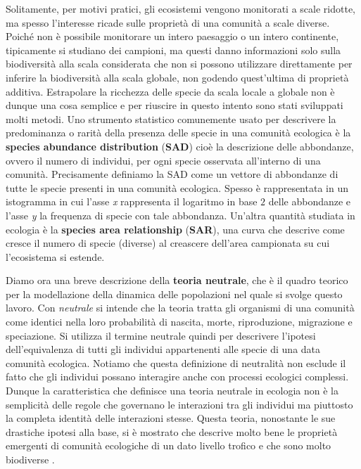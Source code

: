 Solitamente, per motivi pratici, gli ecosistemi vengono monitorati a scale ridotte, ma spesso l'interesse ricade sulle proprietà di una comunità a scale diverse.
Poiché non è possibile monitorare un intero paesaggio o un intero continente, tipicamente si studiano dei campioni, ma questi danno informazioni solo sulla biodiversità alla scala considerata che non si possono utilizzare direttamente per inferire la biodiversità alla scala globale, non godendo quest'ultima di proprietà additiva. Estrapolare la ricchezza delle specie da scala locale a globale non è dunque una cosa semplice e per riuscire in questo intento sono stati sviluppati molti metodi. Uno strumento statistico comunemente usato per descrivere la predominanza o rarità della presenza delle specie in una comunità ecologica è la \textbf{species abundance distribution} (\textbf{SAD}) cioè la descrizione delle abbondanze, ovvero il numero di individui, per ogni specie osservata all'interno di una comunità\cite{doi:McGill2007}. Precisamente definiamo la SAD come un vettore di abbondanze di tutte le specie presenti in una comunità ecologica. Spesso è rappresentata in un istogramma in cui l'asse \emph{x} rappresenta il logaritmo in base $2$ delle abbondanze e l'asse \emph{y} la frequenza di specie con tale abbondanza\cite{Preston}. Un'altra quantità studiata in ecologia è la \textbf{species area relationship} (\textbf{SAR}), una curva che descrive come cresce il numero di specie (diverse) al creascere dell'area campionata su cui l'ecosistema si estende.


Diamo ora una breve descrizione della \textbf{teoria neutrale}, che è il quadro teorico per la modellazione della dinamica delle popolazioni nel quale si svolge questo lavoro\cite{Hubbell}. Con \emph{neutrale} si intende che la teoria tratta gli organismi di una comunità come identici nella loro probabilità di nascita, morte, riproduzione, migrazione e speciazione. Si utilizza il termine neutrale quindi per descrivere l'ipotesi dell'equivalenza di tutti gli individui appartenenti alle specie di una data comunità ecologica. Notiamo che questa definizione di neutralità non esclude il fatto che gli individui possano interagire anche con processi ecologici complessi. Dunque la caratteristica che definisce una teoria neutrale in ecologia non è la semplicità delle regole che governano le interazioni tra gli individui ma piuttosto la completa identità delle interazioni stesse. Questa teoria, nonostante le sue drastiche ipotesi alla base, si è mostrato che descrive molto bene le proprietà emergenti di comunità ecologiche di un dato livello trofico e che sono molto biodiverse \cite{2016AzaeleSuweis}.



